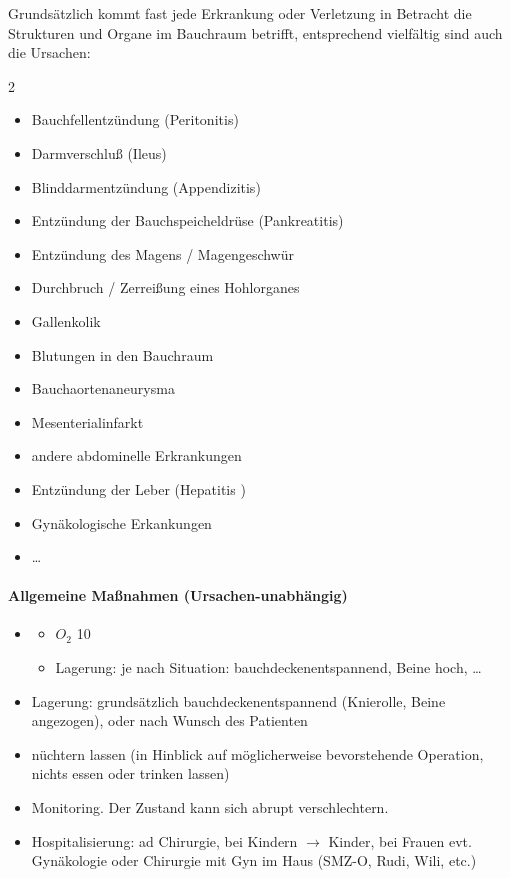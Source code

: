 Grundsätzlich kommt fast jede Erkrankung oder Verletzung in
Betracht die Strukturen und Organe im Bauchraum betrifft,
entsprechend vielfältig sind auch die Ursachen: 

\begin{multicols}{2}
\begin{itemize}
    \item Bauchfellentz\"undung (Peritonitis)
    \item Darmverschlu{\ss} (Ileus)
    \item Blinddarmentz\"undung (Appendizitis)
    \item Entz\"undung der Bauchspeicheldr\"use  (Pankreatitis)
    \item Entz\"undung des Magens / Magengeschw\"ur
    \item Durchbruch / Zerreißung eines Hohlorganes
    \item Gallenkolik
    \item Blutungen in den Bauchraum
    \item Bauchaortenaneurysma
    \item Mesenterialinfarkt
    \item andere abdominelle Erkrankungen
    \item Entz\"undung der Leber (Hepatitis )
    \item Gynäkologische Erkankungen
    \item \ldots
\end{itemize}
\end{multicols}


\begin{gMassnahmenEnv}
    
\paragraph{Allgemeine Ma{\ss}nahmen (Ursachen-unabhängig)}

\begin{itemize}
    \item {} \gTxBeiVit
    \gTxMassVitBes
    \begin{itemize}
        \item $O_2$ 10\gLMin
        \item Lagerung: je nach Situation: bauchdeckenentspannend,
        Beine hoch, \ldots
    \end{itemize}
    \item Lagerung: grundsätzlich bauchdeckenentspannend
    (Knierolle, Beine angezogen), oder nach Wunsch des Patienten
    \item n\"uchtern lassen (in Hinblick auf möglicherweise bevorstehende
    Operation, nichts essen oder trinken lassen)
    \item Monitoring. Der Zustand kann sich abrupt
    verschlechtern.
    \item Hospitalisierung: ad Chirurgie, bei Kindern ${\rightarrow}$ Kinder, bei
    Frauen evt. Gynäkologie oder Chirurgie mit Gyn im Haus (SMZ-O, Rudi,
    Wili, etc.)
\end{itemize}

\end{gMassnahmenEnv}


